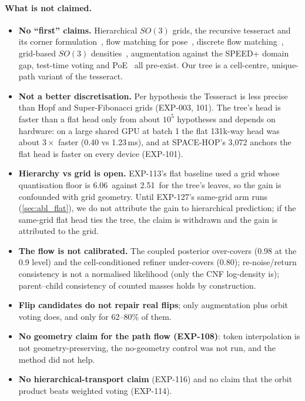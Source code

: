 \paragraph{What is not claimed.}
\begin{itemize}
\item \textbf{No ``first'' claims.} Hierarchical $SO(3)$ grids, the recursive tesseract and its corner formulation~\cite{kurz2017tesseract}, flow matching for pose~\cite{chen2024rfm,hsiao2024liepose}, discrete flow matching~\cite{gat2024dfm}, grid-based $SO(3)$ densities~\cite{murphy2021implicitpdf}, augmentation against the SPEED+ domain gap, test-time voting and PoE~\cite{hinton2002poe} all pre-exist. Our tree is a cell-centre, unique-path variant of the tesseract.
\item \textbf{Not a better discretisation.} Per hypothesis the Tesseract is less precise than Hopf and Super-Fibonacci grids (EXP-003, 101). The tree's head is faster than a flat head only from about $10^5$ hypotheses and depends on hardware: on a large shared GPU at batch 1 the flat 131k-way head was about $3\times$ faster (0.40 vs 1.23\,ms), and at SPACE-HOP's 3,072 anchors the flat head is faster on every device (EXP-101).
\item \textbf{Hierarchy vs grid is open.} EXP-113's flat baseline used a grid whose quantisation floor is 6.06\appDdeg\ against 2.51\appDdeg\ for the tree's leaves, so the gain is confounded with grid geometry. Until EXP-127's same-grid arm runs (\cref{sec:abl_flat}), we do not attribute the gain to hierarchical prediction; if the same-grid flat head ties the tree, the claim is withdrawn and the gain is attributed to the grid.
\item \textbf{The flow is not calibrated.} The coupled posterior over-covers (0.98 at the 0.9 level) and the cell-conditioned refiner under-covers (0.80); re-noise/return consistency is not a normalised likelihood (only the CNF log-density is); parent--child consistency of counted masses holds by construction.
\item \textbf{Flip candidates do not repair real flips}; only augmentation plus orbit voting does, and only for 62--80\% of them.
\item \textbf{No geometry claim for the path flow (EXP-108)}: token interpolation is not geometry-preserving, the no-geometry control was not run, and the method did not help.
\item \textbf{No hierarchical-transport claim} (EXP-116) and no claim that the orbit product beats weighted voting (EXP-114).

\end{itemize}

